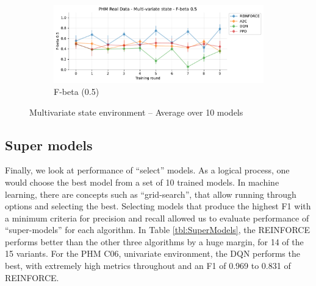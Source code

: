 \documentclass[a4paper, 12pt]{article}
\begin{document}
\begin{figure}[ht]
	\begin{subfigure}{\textwidth}
		\centering
		\includegraphics[width=\linewidth]{Multivariate_F05.pdf}  
		\caption{F-beta (0.5)}
		\label{fig:tr-ms-f05}
	\end{subfigure}
	\caption{Multivariate state environment -- Average over 10 models}
	\label{fig:tr-ms-env}
\end{figure}

\subsection{Super models}
Finally, we look at performance of ``select'' models. As a logical process, one would choose the best model from a set of 10 trained models. In machine learning, there are concepts such as ``grid-search'', that allow running through options and selecting the best. Selecting models that produce the highest F1 with a minimum criteria for precision and recall allowed us to evaluate performance of ``super-models'' for each algorithm. In Table \ref{tbl:SuperModels}, the REINFORCE performs better than the other three algorithms by a huge margin, for 14 of the 15 variants. For the PHM C06, univariate environment, the DQN performs the best, with extremely high metrics throughout and an F1 of 0.969 to 0.831 of REINFORCE.
\end{document}
